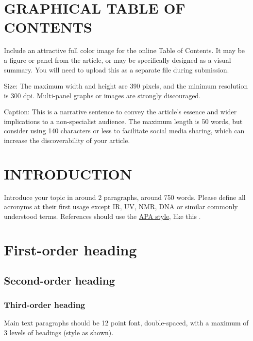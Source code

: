 \documentclass[12pt]{article}
\begin{document}
\clearpage

\renewcommand{\baselinestretch}{1.5}
\normalsize

\clearpage

\section*{\sffamily \Large GRAPHICAL TABLE OF CONTENTS} 
Include an attractive full color image for the online Table of Contents. It may be a figure or panel from the article, or may be specifically designed as a visual summary. You will need to upload this as a separate file during submission.

Size: The maximum width and height are 390 pixels, and the minimum resolution is 300 dpi. Multi-panel graphs or images are strongly discouraged.

Caption: This is a narrative sentence to convey the article's essence and wider implications to a non-specialist audience. The maximum length is 50 words, but consider using 140 characters or less to facilitate social media sharing, which can increase the discoverability of your article.

\section*{\sffamily \Large INTRODUCTION} 

Introduce your topic in around 2 paragraphs, around 750 words.  Please define all acronyms at their first usage except IR, UV, NMR, DNA or similar commonly understood terms.  References should use the \href{http://www.apastyle.org/learn/quick-guide-on-references.aspx}{APA style}, like this \cite{coulson1960present}.


\section*{\sffamily \Large First-order heading}
\subsection*{\sffamily \large Second-order heading}
\subsubsection*{\sffamily \normalsize Third-order heading}
Main text paragraphs should be 12 point font, double-spaced, with a maximum of 3 levels of headings (style as shown).
\end{document}
